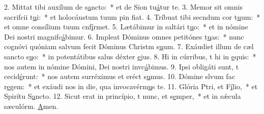 2. Mittat tibi auxílum de s\uline{a}ncto:~* et de Sion tu\uline{á}tur te.
3. Memor sit omnis sacrifcii t\uline{u}i:~* et holocáustum tuum pin f\uline{i}at.
4. Tríbuat tibi secndum cor t\uline{u}um:~* et omne consílium tuum cnf\uline{í}rmet.
5. Lætábimur in saltári t\uline{u}o:~* et in nómine Dei nostri magnifc\uline{á}bimur.
6. Impleat Dóminus omnes petitónes t\uline{u}as:~* nunc cognóvi quóniam salvum fecit Dóminus Christm s\uline{u}um.
7. Exáudiet illum de cæl sancto s\uline{u}o:~* in potentátibus salus déxter \uline{e}jus.
8. Hi in cúrribus, t hi in \uline{e}quis:~* nos autem in nómine Dómini, Dei nostri invc\uline{á}bimus.
9. Ipsi obligáti sunt, t cecid\uline{é}runt:~* nos autem surréximus et eréct s\uline{u}mus.
10. Dómine slvum fac r\uline{e}gem:~* et exáudi nos in die, qua invocavérm\uline{u}s te.
11. Glória Ptri, et F\uline{í}lio,~* et Spirítu S\uline{a}ncto.
12. Sicut erat in princípio, t nunc, et s\uline{e}mper,~* et in sǽcula sæculórm. \uline{A}men.

